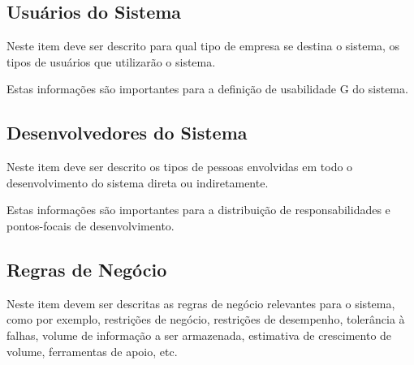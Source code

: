 \subsection{Usuários do Sistema}

Neste item deve ser descrito para qual tipo de empresa se destina o sistema, os tipos de usuários que utilizarão o sistema.

Estas informações são importantes para a definição de usabilidade G do sistema.

\subsection{Desenvolvedores do Sistema}

Neste item deve ser descrito os tipos de pessoas envolvidas em todo o desenvolvimento do sistema direta ou indiretamente.

Estas informações são importantes para a distribuição de responsabilidades e pontos-focais de desenvolvimento.

\subsection{Regras de Negócio}

Neste item devem ser descritas as regras de negócio relevantes para o sistema, como por exemplo, restrições de negócio, restrições de desempenho, tolerância à falhas, volume de informação a ser armazenada, estimativa de crescimento de volume, ferramentas de apoio, etc.
